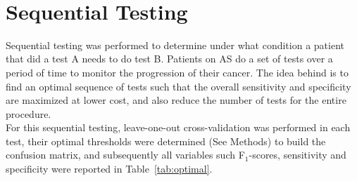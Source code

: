 \documentclass[]{article}
\begin{document}
\begin{minipage}{\linewidth}
\label{fig:auprc_auroc_plot}     
\end{minipage} \\

\section{Sequential Testing}

\noindent Sequential testing was performed to determine under what condition a patient that did a test A
needs to do test B. Patients on AS do a set of tests over a period of time to monitor the progression 
of their cancer. The idea behind is to find an optimal sequence of tests such that the overall sensitivity 
and specificity are maximized at lower cost, and also reduce the number of tests for the entire procedure. \\

\noindent For this sequential testing, leave-one-out cross-validation was performed in each test, their 
optimal thresholds were determined (See Methods) to build the confusion matrix, and subsequently all variables
such F$_{1}$-scores, sensitivity and specificity were reported in Table~\ref{tab:optimal}. \\
\end{document}
